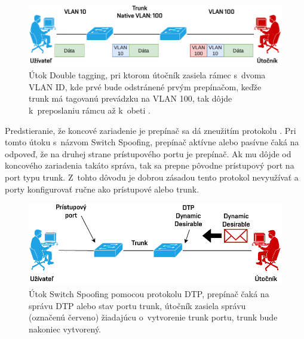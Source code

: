 \begin{figure}[H]
	\begin{center}
		\includegraphics[scale=0.75]{obrazky/double-tagging.pdf}
	\end{center}
	\caption[VLAN Hopping s~Double Tagging]{Útok Double tagging, pri ktorom útočník zasiela rámec s~dvoma VLAN ID, kde prvé bude odstránené prvým prepínačom, keďže trunk má tagovanú prevádzku na VLAN 100, tak dôjde k~preposlaniu rámcu až k~obeti \cite{srOo9OPXJxHjPBgo}.}
	\label{fig:double-tagging}
\end{figure} 

\noindent
Predstieranie, že koncové zariadenie je prepínač sa dá zneužitím protokolu  \cite{uYLsMtQInofenpV3}. Pri tomto útoku s~názvom Switch Spoofing, prepínač aktívne alebo pasívne čaká na odpoveď, že na druhej strane prístupového portu je prepínač. Ak mu dôjde od koncového zariadenia takáto správa, tak sa prepne pôvodne prístupový port na port typu trunk. Z~tohto dôvodu je dobrou zásadou tento protokol nevyužívať a porty konfigurovať ručne ako prístupové alebo trunk.

\begin{figure}[H]
	\begin{center}
		\includegraphics[scale=0.75]{obrazky/switch-spoofing.pdf}
	\end{center}
	\caption[Útok Switch Spoofing pomocou protokolu DTP]{Útok Switch Spoofing pomocou protokolu DTP, prepínač čaká na správu DTP alebo stav portu trunk, útočník zasiela správu (označenú červeno) žiadajúcu o~vytvorenie trunk portu, trunk bude nakoniec vytvorený.}
	\label{fig:switch-spoofing}
\end{figure} 

